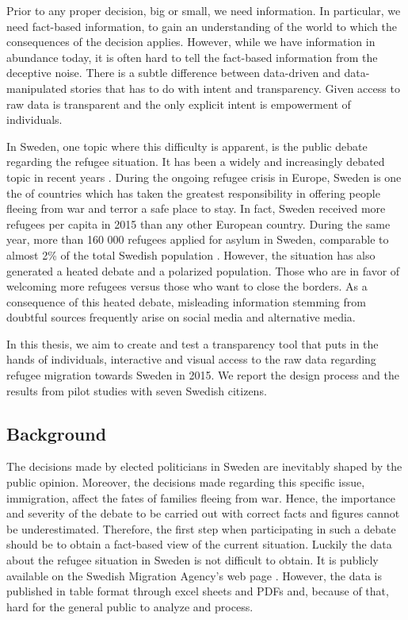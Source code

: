 \documentclass{acmtog} %
\begin{document}
Prior to any proper decision, big or small, we need information. In particular, we need fact-based information, to gain an understanding of the world to which the consequences of the decision applies. However, while we have information in abundance today, it is often hard to tell the fact-based information from the deceptive noise. There is a subtle difference between data-driven and data-manipulated stories that has to do with intent and transparency. Given access to raw data is transparent and the only explicit intent is empowerment of individuals.

In Sweden, one topic where this difficulty is apparent, is the public debate regarding the refugee situation. It has been a widely and increasingly debated topic in recent years \cite{dn}. During the ongoing refugee crisis in Europe, Sweden is one the of countries which has taken the greatest responsibility in offering people fleeing from war and terror a safe place to stay. In fact, Sweden received more refugees per capita in 2015 than any other European country. During the same year, more than 160 000 refugees applied for asylum in Sweden, comparable to almost 2\% of the total Swedish population \cite{migrationsverket}. However, the situation has also generated a heated debate and a polarized population. Those who are in favor of welcoming more refugees versus those who want to close the borders. As a consequence of this heated debate, misleading information stemming from doubtful sources frequently arise on social media and alternative media.

In this thesis, we aim to create and test a transparency tool that puts in the hands of individuals, interactive and visual access to the raw data regarding refugee migration towards Sweden in 2015. We report the design process and the results from pilot studies with seven Swedish citizens.

\subsection{Background}
\label{sub:background}
The decisions made by elected politicians in Sweden are inevitably shaped by the public opinion. Moreover, the decisions made regarding this specific issue, immigration, affect the fates of families fleeing from war. Hence, the importance and severity of the debate to be carried out with correct facts and figures cannot be underestimated. Therefore, the first step when participating in such a debate should be to obtain a fact-based view of the current situation. Luckily the data about the refugee situation in Sweden is not difficult to obtain. It is publicly available on the Swedish Migration Agency's web page \cite{migrationsverket}. However, the data is published in table format through excel sheets and PDFs and, because of that, hard for the general public to analyze and process.
\end{document}

